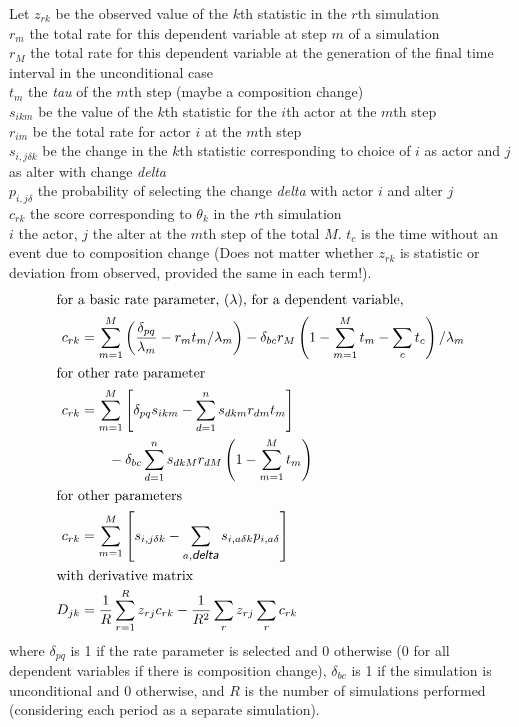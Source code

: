 \documentclass[12pt,a4paper]{article}
\renewcommand{\=}{\,=\,}
\newcommand{\+}{\,+\,}
\newcommand{\nnm}[1]{\textsf{\small\textit{#1}}}
\begin{document}
Let $z_{rk}$ be the observed value of the $k$th
statistic in the $r$th simulation\\
$r_m$ the total rate for this dependent variable at step $m$ of a simulation\\
$r_M$ the total rate for this dependent variable at the generation of the final
time interval in the unconditional case\\
$t_m$ the \nnm{tau} of the $m$th step (maybe a composition change)\\
$s_{ikm}$ be the value of the $k$th statistic for the $i$th actor at
the $m$th step\\
$r_{im}$ be the total rate for actor $i$ at the $m$th step\\
$s_{i,j\delta k}$ be the change in the $k$th statistic corresponding to
choice of $i$ as actor and $j$ as alter with change \nnm{delta}\\
$p_{i,j \delta }$ the probability of selecting the change \nnm{delta} with actor
$i$ and alter $j$\\
$c_{rk}$ the score corresponding to $\theta_k$ in the $r$th
simulation\\
$i$ the actor, $j$ the alter at the $m$th step of the total $M$.
$t_c$ is the time without an event due to composition change
(Does not matter
whether $z_{rk}$ is statistic or deviation from observed, provided the
same in each term!).
\begin{align*}
\intertext{for a basic rate parameter, $(\lambda)$, for a
dependent variable,}
c_{rk} &= \sum_{m=1}^M \left(
  \frac{\delta_{pq}}{\lambda_m} - r_m t_m / \lambda_m\right ) - \delta_{bc}
r_M  \left (1- \sum_{m=1}^M t_m - \sum_ct_c
  \right)/\lambda_m\\
\intertext{for other rate parameter}
c_{rk}&= \sum_{m=1}^M \left [\delta_{pq} s_{ikm}- \sum_{d=1}^n s_{dkm} r_{dm}t_m\right]\\
& \qquad - \delta_{bc}\sum_{d=1}^n s_{dkM}
r_{dM}\left (1- \sum_{m=1}^M t_m  \right)\\
\intertext{for other parameters}
c_{rk}&= \sum_{m=1}^M \left [ s_{i,j\delta k}- \sum_{a,\nnm{delta}}
  s_{i,a\delta k}p_{i,a\delta}\right]\\
\intertext{with derivative matrix}
 D_{jk}&=\frac{1}{R}\sum_{r=1}^R z_{rj}c_{rk}
 - \frac{1}{R^2}\sum_r z_{rj} \sum_r c_{rk}\\
\end{align*}
where $\delta_{pq}$ is 1 if the rate parameter is selected and 0 otherwise (0
for all dependent variables if there is composition change), $\delta_{bc}$ is 1
if the simulation is unconditional and 0 otherwise, and $R$ is the number of
simulations performed (considering each period as a separate simulation).
\end{document}
